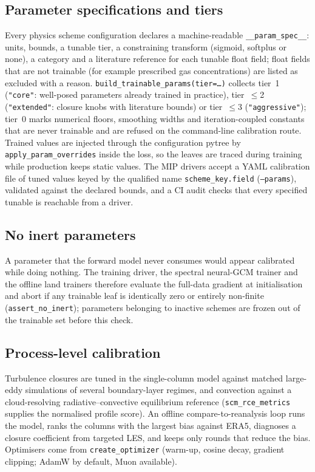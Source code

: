 \documentclass[11pt,a4paper]{article}
\begin{document}
\subsection{Parameter specifications and tiers}
Every physics scheme configuration declares a machine-readable \texttt{\_\_param\_spec\_\_}: units, bounds, a tunable tier, a constraining transform (sigmoid, softplus or none), a category and a literature reference for each tunable float field; float fields that are not trainable (for example prescribed gas concentrations) are listed as excluded with a reason.  \texttt{build\_trainable\_params(tier=\ldots)} collects tier~1 (\texttt{"core"}: well-posed parameters already trained in practice), tier~$\le$2 (\texttt{"extended"}: closure knobs with literature bounds) or tier~$\le$3 (\texttt{"aggressive"}); tier~0 marks numerical floors, smoothing widths and iteration-coupled constants that are never trainable and are refused on the command-line calibration route.  Trained values are injected through the configuration pytree by \texttt{apply\_param\_overrides} inside the loss, so the leaves are traced during training while production keeps static values.  The MIP drivers accept a YAML calibration file of tuned values keyed by the qualified name \texttt{scheme\_key.field} (\texttt{--params}), validated against the declared bounds, and a CI audit checks that every specified tunable is reachable from a driver.

\subsection{No inert parameters}
A parameter that the forward model never consumes would appear calibrated while doing nothing.  The training driver, the spectral neural-GCM trainer and the offline land trainers therefore evaluate the full-data gradient at initialisation and abort if any trainable leaf is identically zero or entirely non-finite (\texttt{assert\_no\_inert}); parameters belonging to inactive schemes are frozen out of the trainable set before this check.

\subsection{Process-level calibration}
Turbulence closures are tuned in the single-column model against matched large-eddy simulations of several boundary-layer regimes, and convection against a cloud-resolving radiative--convective equilibrium reference (\texttt{scm\_rce\_metrics} supplies the normalised profile score).  An offline compare-to-reanalysis loop runs the model, ranks the columns with the largest bias against ERA5, diagnoses a closure coefficient from targeted LES, and keeps only rounds that reduce the bias.  Optimisers come from \texttt{create\_optimizer} (warm-up, cosine decay, gradient clipping; AdamW by default, Muon available).
\end{document}
